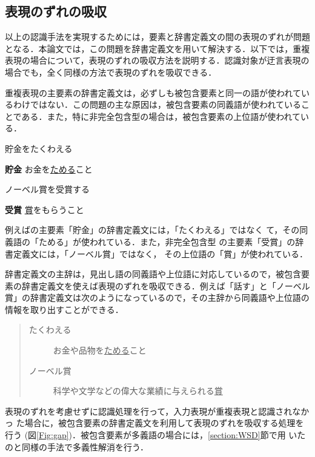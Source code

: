 \documentclass{nlp}
\begin{document}
 
\subsection{表現のずれの吸収}
\label{section:gap}
以上の認識手法を実現するためには，要素と辞書定義文の間の表現のずれが問題
となる．本論文では，この問題を辞書定義文を用いて解決する．以下では，重複
表現の場合について，表現のずれの吸収方法を説明する．認識対象が迂言表現の
場合でも，全く同様の方法で表現のずれを吸収できる．

重複表現の主要素の辞書定義文は，必ずしも被包含要素と同一の語が使われてい
るわけではない．この問題の主な原因は，被包含要素の同義語が使われているこ
とである．また，特に非完全包含型の場合は，被包含要素の上位語が使われてい
る．
\begin{example}
 \item 貯金をたくわえる

 {\bf 貯金} \hspace{10pt}お金を\underline{ためる}こと
 
 \item ノーベル賞を受賞する

 {\bf 受賞} \hspace{10pt}\underline{賞}をもらうこと 
\end{example}
例えばの主要素「貯金」の辞書定義文には，「たくわえる」ではなく
て，その同義語の「ためる」が使われている．また，非完全包含型
の主要素「受賞」の辞書定義文には，「ノーベル賞」ではなく，
その上位語の「賞」が使われている．

辞書定義文の主辞は，見出し語の同義語や上位語に対応しているので，被包含要
素の辞書定義文を使えば表現のずれを吸収できる．例えば「話す」と「ノーベル
賞」の辞書定義文は次のようになっているので，その主辞から同義語や上位語の
情報を取り出すことができる．
\begin{quote}
 \begin{description}
  \item [たくわえる] お金や品物を\underline{ためる}こと  
  \item [ノーベル賞] 科学や文学などの偉大な業績に与えられる\underline{賞}
 \end{description}
\end{quote}
表現のずれを考慮せずに認識処理を行って，入力表現が重複表現と認識されなかっ
た場合に，被包含要素の辞書定義文を利用して表現のずれを吸収する処理を行う
(図\ref{Fig:gap})．被包含要素が多義語の場合には，\ref{section:WSD}節で用
いたのと同様の手法で多義性解消を行う．
\end{document}
